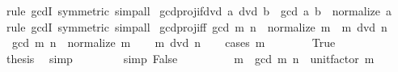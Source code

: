 \begin{isabellebody}
\endisadelimproof
%
\isatagproof
{}\isamarkupfalse%
\ {\isacharparenleft}{\kern0pt}rule\ gcdI\ {\isacharbrackleft}{\kern0pt}symmetric{\isacharbrackright}{\kern0pt}{\isacharparenright}{\kern0pt}\ simp{\isacharunderscore}{\kern0pt}all%
\endisatagproof
{\isafoldproof}%
%
\isadelimproof
\isanewline
%
\endisadelimproof
\isanewline
{}\isamarkupfalse%
\ gcd{\isacharunderscore}{\kern0pt}proj{}{\isacharunderscore}{\kern0pt}if{\isacharunderscore}{\kern0pt}dvd{\isacharcolon}{\kern0pt}\ {\isachardoublequoteopen}a\ dvd\ b\ {\isasymLongrightarrow}\ gcd\ a\ b\ {\isacharequal}{\kern0pt}\ normalize\ a{\isachardoublequoteclose}\isanewline
%
\isadelimproof
\ \ %
\endisadelimproof
%
\isatagproof
{}\isamarkupfalse%
\ {\isacharparenleft}{\kern0pt}rule\ gcdI\ {\isacharbrackleft}{\kern0pt}symmetric{\isacharbrackright}{\kern0pt}{\isacharparenright}{\kern0pt}\ simp{\isacharunderscore}{\kern0pt}all%
\endisatagproof
{\isafoldproof}%
%
\isadelimproof
\isanewline
%
\endisadelimproof
\isanewline
{}\isamarkupfalse%
\ gcd{\isacharunderscore}{\kern0pt}proj{}{\isacharunderscore}{\kern0pt}iff{\isacharcolon}{\kern0pt}\ {\isachardoublequoteopen}gcd\ m\ n\ {\isacharequal}{\kern0pt}\ normalize\ m\ {\isasymlongleftrightarrow}\ m\ dvd\ n{\isachardoublequoteclose}\isanewline
%
\isadelimproof
%
\endisadelimproof
%
\isatagproof
{}\isamarkupfalse%
\isanewline
\ \ \isamarkupfalse%
\ {\isacharasterisk}{\kern0pt}{\isacharcolon}{\kern0pt}\ {\isachardoublequoteopen}gcd\ m\ n\ {\isacharequal}{\kern0pt}\ normalize\ m{\isachardoublequoteclose}\isanewline
\ \ \isamarkupfalse%
\ {\isachardoublequoteopen}m\ dvd\ n{\isachardoublequoteclose}\isanewline
\ \ \isamarkupfalse%
\ {\isacharparenleft}{\kern0pt}cases\ {\isachardoublequoteopen}m\ {\isacharequal}{\kern0pt}\ {}{\isachardoublequoteclose}{\isacharparenright}{\kern0pt}\isanewline
\ \ \ \ \isamarkupfalse%
\ True\isanewline
\ \ \ \ \isamarkupfalse%
\ {\isacharasterisk}{\kern0pt}\ \isamarkupfalse%
\ {\isacharquery}{\kern0pt}thesis\ \isamarkupfalse%
\ simp\isanewline
\ \ \isamarkupfalse%
\isanewline
\ \ \ \ \isamarkupfalse%
\ {\isacharbrackleft}{\kern0pt}simp{\isacharbrackright}{\kern0pt}{\isacharcolon}{\kern0pt}\ False\isanewline
\ \ \ \ \isamarkupfalse%
\ {\isacharasterisk}{\kern0pt}\ \isamarkupfalse%
\ {\isacharasterisk}{\kern0pt}{\isacharasterisk}{\kern0pt}{\isacharcolon}{\kern0pt}\ {\isachardoublequoteopen}m\ {\isacharequal}{\kern0pt}\ gcd\ m\ n\ {\isacharasterisk}{\kern0pt}\ unit{\isacharunderscore}{\kern0pt}factor\ m{\isachardoublequoteclose}\isanewline

\end{isabellebody}
